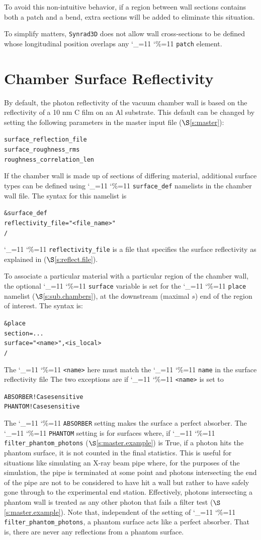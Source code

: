 \documentclass[11pt,openany]{report}
\newcommand{\sref}[1]{$\S$\ref{#1}}
\newcommand{\srthree}{\texttt{Synrad3D}\xspace}
\newcommand\ttcmd{\begingroup\catcode`\_=11 \catcode`\%=11 \dottcmd}
\newcommand\dottcmd[1]{\texttt{#1}\endgroup}
\newcommand{\vn}{\ttcmd}
\newlength{\ExBeg}
\newlength{\ExEnd}
\newenvironment{example}
  {\vspace{\ExBeg} \begin{alltt}}
  {\end{alltt} \vspace{\ExEnd}}
\begin{document}
To avoid this non-intuitive behavior, if a region between wall sections
contains both a patch and a bend, extra sections will be added to
eliminate this situation.

To simplify matters, \srthree does not allow wall cross-sections to be
defined whose longitudinal position overlaps any \vn{patch} element.

\section{Chamber Surface Reflectivity}
\label{s:surface}

By default, the photon reflectivity of the vacuum chamber wall is based on the
reflectivity of a 10 nm C film on an Al substrate. This default can be changed by setting
the following parameters in the master input file (\sref{s:master}):
\begin{example}
    surface_reflection_file
    surface_roughness_rms
    roughness_correlation_len 
\end{example}

If the chamber wall is made up of sections of differing material,
additional surface types can be defined using \vn{surface_def}
namelists in the chamber wall file. The syntax for this namelist is
\begin{example}
  &surface_def
    reflectivity_file = "<file_name>"
  / 
\end{example}
\vn{reflectivity_file} is a file that specifies the surface reflectivity as 
explained in (\sref{s:reflect.file}).

To associate a particular material with a particular region of the
chamber wall, the optional \vn{surface} variable is set for the
\vn{place} namelist (\sref{s:sub.chambers}), at the downstream
(maximal $s$) end of the region of interest. The syntax is:
\begin{example}
  &place
    section = ...
    surface  = "<name>", <is_local>
  /
\end{example}
The \vn{<name>} here must match the \vn{name} in the surface reflectivity file The two
exceptions are if \vn{<name>} is set to
\begin{example}
  ABSORBER              ! Case sensitive
  PHANTOM               ! Case sensitive
\end{example}
The \vn{ABSORBER} setting makes the surface a perfect absorber. The \vn{PHANTOM} setting
is for surfaces where, if \vn{filter_phantom_photons} (\sref{s:master.example}) is True,
if a photon hits the phantom surface, it is not counted in the final statistics. This is
useful for situations like simulating an X-ray beam pipe where, for the purposes of the
simulation, the pipe is terminated at some point and photons intersecting the end of the
pipe are not to be considered to have hit a wall but rather to have safely gone through to
the experimental end station. Effectively, photons intersecting a phantom wall is treated
as any other photon that fails a filter test (\sref{s:master.example}). Note that,
independent of the setting of \vn{filter_phantom_photons}, a phantom surface acts like a
perfect absorber. That is, there are never any reflections from a phantom surface.
\end{document}
